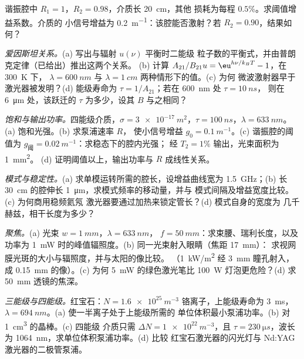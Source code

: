 \begin{exercise}[$\star$]\label{exo:b2:laser:4}
谐振腔中 $R_1 = 1$，$R_2 = 0.98$，介质长 \qty{20}{cm}，其他
损耗为每程 $0.5\%$。求阈值增益系数。介质的
小信号增益为 \qty{0.2}{m^{-1}}：该腔能否激射？若
$R_2 = 0.90$，结果如何？
\end{exercise}

\begin{exercise}[$\star\star$]\label{exo:b2:laser:5}
\emph{爱因斯坦关系。}(a) 写出与辐射 $u(\nu)$ 平衡时二能级
粒子数的平衡式，并由普朗克定律（已给出）推出这两个关系。
(b) 计算
$A_{21}/B_{21}u = \eu^{h\nu/k_BT} - 1$，在 \qty{300}{K} 下，
$\lambda = \qty{600}{nm}$ 与 $\lambda = \qty{1}{cm}$ 两种情形下的值。(c) 为何
微波激射器早于激光器被发明？(d) 能级寿命为
$\tau = 1/A_{21}$；若在 \qty{600}{nm} 处 $\tau = \qty{10}{ns}$，
则在 \qty{6}{\micro m} 处，该跃迁的 $\tau$ 为多少，设其 $B$ 与之相同？
\end{exercise}

\begin{exercise}[$\star\star$]\label{exo:b2:laser:6}
\emph{饱和与输出功率。}四能级介质，$\sigma =
\qty{3e-17}{m^2}$，$\tau = \qty{100}{ns}$，$\lambda = \qty{633}{nm}$。
(a) 饱和光强。(b) 求泵浦速率 $R$，
使小信号增益 $g_0 = \qty{0.1}{m^{-1}}$。(c) 谐振腔的阈值为
$g_{\text{阈}} = \qty{0.02}{m^{-1}}$：求稳态下的腔内光强；
经 $T_2 = 1\%$ 输出，光束面积为 \qty{1}{mm^2}。
(d) 证明阈值以上，输出功率与 $R$ 成线性关系。
\end{exercise}

\begin{exercise}[$\star\star$]\label{exo:b2:laser:7}
\emph{模式与稳定性。}(a) 求单模运转所需的腔长，设增益曲线宽为
\qty{1.5}{GHz}；(b) 长 \qty{30}{cm} 的腔伸长
\qty{1}{\micro m}，求模式频率的移动量，并与
模式间隔及增益宽度比较。(c) 为何商用稳频氦氖
激光器要通过加热来锁定管长？(d) 模式自身的宽度为
几千赫兹，相干长度为多少？
\end{exercise}

\begin{exercise}[$\star\star$]\label{exo:b2:laser:8}
\emph{聚焦。}(a) 光束 $w = \qty{1}{mm}$，$\lambda = \qty{633}{nm}$，
$f = \qty{50}{mm}$：求束腰、瑞利长度，以及功率为
\qty{1}{mW} 时的峰值辐照度。(b) 同一光束射入眼睛（焦距 \qty{17}{mm}）：
求视网膜光斑的大小与辐照度，并与太阳的像比较。
（\qty{1}{kW/m^2} 经 \qty{3}{mm} 瞳孔射入，成 \qty{0.15}{mm}
的像）。(c) 为何 \qty{5}{mW} 的绿色激光笔比
\qty{100}{W} 灯泡更危险？(d) 求 \qty{50}{mm} 透镜的焦深。
\end{exercise}

\begin{exercise}[$\star\star$]\label{exo:b2:laser:9}
\emph{三能级与四能级。}红宝石：$N = \qty{1.6e25}{m^{-3}}$
铬离子，上能级寿命为 \qty{3}{ms}，$\lambda =
\qty{694}{nm}$。(a) 使一半离子处于上能级所需的
单位体积最小泵浦功率。(b) 对 \qty{1}{cm^3} 的晶棒。(c) 四能级
介质只需 $\Delta N = \qty{1e22}{m^{-3}}$，且 $\tau =
\qty{230}{\micro s}$，波长为 \qty{1064}{nm}，求单位体积泵浦功率。(d) 比较
红宝石激光器的闪光灯与 Nd:YAG 激光器的二极管泵浦。
\end{exercise}

